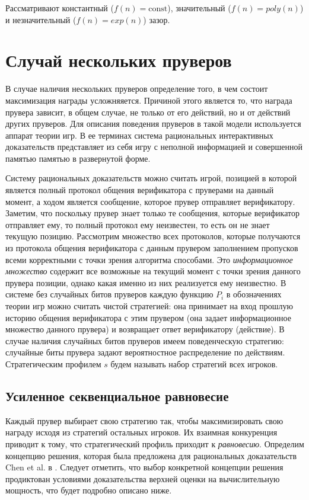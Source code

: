 \documentclass[14pt, a4paper, russian]{report}
\begin{document}
        Рассматривают константный ($f(n) = \text{const}$), значительный ($f(n) = \textit{poly}(n)$) и незначительный ($f(n) = \textit{exp}(n)$) зазор.

        \chapter{Случай нескольких пруверов}
        В случае наличия нескольких пруверов определение того, в чем состоит максимизация награды усложняяется. Причиной этого является то, что награда прувера зависит, в общем случае, не только от его действий, но и от действий других пруверов. Для описания поведения пруверов в такой модели используется аппарат теории игр. В ее терминах система рациональных интерактивных доказательств представляет из себя игру с неполной информацией и совершенной памятью памятью в развернутой форме.

        Систему рациональных доказательств можно считать игрой, позицией в которой является полный протокол общения верификатора с пруверами на данный момент, а ходом является сообщение, которое прувер отправляет верификатору. Заметим, что поскольку прувер знает только те сообщения, которые верификатор отправляет ему, то полный протокол ему неизвестен, то есть он не знает текущую позицию.
        Рассмотрим множество всех протоколов, которые получаются из протокола общения верификатора с данным прувером заполнением пропусков всеми корректными с точки зрения алгоритма способами.
        Это \textit{информационное множество} содержит все возможные на текущий момент с точки зрения данного прувера позиции, однако какая именно из них реализуется ему неизвестно.
        В системе без случайных битов пруверов каждую функцию $P_i$ в обозначениях теории игр можно считать чистой стратегией: она принимает на вход прошлую историю общения верификатора с этим прувером (она задает информационное множество данного прувера) и возвращает ответ верификатору (действие). В случае наличия случайных битов пруверов имеем поведенческую стратегию: случайные биты прувера задают вероятностное распределение по действиям. Стратегическим профилем $s$ будем называть набор стратегий всех игроков.

        \section{Усиленное секвенциальное равновесие}

        Каждый прувер выбирает свою стратегию так, чтобы максимизировать свою награду исходя из стратегий остальных игроков.
        Их взаимная конкуренция приводит к тому, что стратегический профиль приходит к \textit{равновесию}. Определим концепцию решения, которая была предложена для рациональных доказательств Chen et al. в \cite{chen2017noncoop}.
        Следует отметить, что выбор конкретной концепции решения продиктован условиями доказательства верхней оценки на вычислительную мощность, что будет подробно описано ниже.
\end{document}
